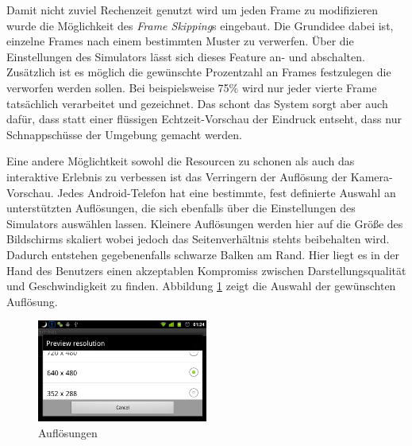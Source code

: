 \documentclass[a4paper]{article}
\begin{document}
Damit nicht zuviel Rechenzeit genutzt wird um jeden Frame zu modifizieren wurde die Möglichkeit des \textit{Frame Skipping}s eingebaut. Die Grundidee dabei ist, einzelne Frames nach einem bestimmten Muster zu verwerfen. Über die Einstellungen des Simulators lässt sich dieses Feature an- und abschalten. Zusätzlich ist es möglich die gewünschte Prozentzahl an Frames festzulegen die verworfen werden sollen. Bei beispielsweise 75\% wird nur jeder vierte Frame tatsächlich verarbeitet und gezeichnet. Das schont das System sorgt aber auch dafür, dass statt einer flüssigen Echtzeit-Vorschau der Eindruck entseht, dass nur Schnappschüsse der Umgebung gemacht werden.

Eine andere Möglichtkeit sowohl die Resourcen zu schonen als auch das interaktive Erlebnis zu verbessen ist das Verringern der Auflösung der Kamera-Vorschau. Jedes Android-Telefon hat eine bestimmte, fest definierte Auswahl an unterstützten Auflösungen, die sich ebenfalls über die Einstellungen des Simulators auswählen lassen. Kleinere Auflösungen werden hier auf die Größe des Bildschirms skaliert wobei jedoch das Seitenverhältnis stehts beibehalten wird. Dadurch entstehen gegebenenfalls schwarze Balken am Rand. Hier liegt es in der Hand des Benutzers einen akzeptablen Kompromiss zwischen Darstellungsqualität und Geschwindigkeit zu finden. Abbildung \ref{resolutions} zeigt die Auswahl der gewünschten Auflösung.

\begin{figure}[H]
\centering
\includegraphics[width=0.5\textwidth, trim=0 0 0 39, clip=true]{resolutions.png}
\caption{Auflösungen}
\label{resolutions}
\end{figure}

\newpage

\nocite{ANDROID}
\nocite{GIZMODO}
\nocite{IBFB}
\printbibliography

\listoffigures

\renewcommand\listoflistingscaption{Quellcodeverzeichnis}
\listoflistings
\end{document}
